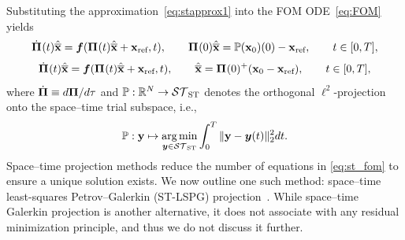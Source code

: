 \documentclass[3p,computermodern,10pt]{elsarticle}
\begin{document}
Substituting the approximation~\eqref{eq:stapprox1} into the FOM
ODE~\eqref{eq:FOM} yields
\begin{equation}\label{eq:st_fom}
\dot{\boldsymbol \Pi}^{}(t) \hat{\mathbf{\overline{x}}} =  \boldsymbol f(\boldsymbol \Pi^{}(t) \hat{\mathbf{\overline{x}}} +
	\mathbf{x}_\text{ref},t) , \qquad 
	\boldsymbol \Pi^{}(0) \hat{\mathbf{\overline{x}}}
	=\mathbb{P}({{\mathbf{x}}_0})(0)-\mathbf{x}_\text{ref}, \qquad t \in [0,T],
\end{equation}
\begin{equation}\label{eq:st_fom}
\dot{\boldsymbol \Pi}^{}(t) \hat{\mathbf{\overline{x}}} =  \boldsymbol f(\boldsymbol \Pi^{}(t) \hat{\mathbf{\overline{x}}} +
	\mathbf{x}_\text{ref},t) , \qquad 
	\hat{\mathbf{\overline{x}}}
	=
	\boldsymbol \Pi^{}(0)^+ ({{\mathbf{x}}_0}-\mathbf{x}_\text{ref}), \qquad t \in [0,T],
\end{equation}
where 
$\dot{\boldsymbol \Pi}\equiv d\boldsymbol \Pi/d\tau$ and
$\mathbb{P} : \mathbb{R}^{N} \rightarrow \mathcal{ ST }_{\text{ST}}$ denotes the
orthogonal $\ell^2$-projection onto the space--time trial subspace, i.e.,
$$
\mathbb{P}:\mathbf{y}\mapsto\underset{\boldsymbol y\in\mathcal{ ST }_{\text{ST}}}{\text{arg\,min}}\int_0^T\|\mathbf{y}
- \boldsymbol y( t)\|_2^2d t.
$$
Space--time projection methods reduce the number of equations in
\eqref{eq:st_fom} to ensure a unique solution exists.
We now outline one such method: space--time least-squares Petrov--Galerkin (ST-LSPG)
projection~\cite{choi_stlspg}. 
While space--time Galerkin projection  is another alternative, it does not
associate with any residual minimization principle, and thus we do not discuss
it further.
\end{document}

